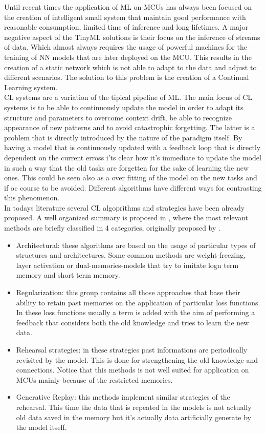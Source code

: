 \documentclass[12pt]{report}
\begin{document}
Until recent times the application of ML on MCUs has always been focused on the creation of intelligent small system that maintain good performance with reasonable consumption, limited time of inference and long lifetimes. A major negative aspect of the TinyML solutions is their focus on the inference of streams of data. Which almost always requires the usage of powerful machines for the training of NN models that are later deployed on the MCU. This results in the creation of a static network which is not able to adapt to the data and adjust to different scenarios. The solution to this problem is the creation of a Continual Learning system. \\
CL systems are a variation of the tipical pipeline of ML. The main focus of CL systems is to be able to continuously update the model in order to adapt its structure and parameters to overcome context drift, be able to recognize appearance of new patterns and to avoid catastrophic forgetting. The latter is a problem that is directly introduced by the nature of the paradigm itself. By having a model that is continuously updated with a feedback loop that is directly dependent on the current erross i'ts clear how it's immediate to update the model in such a way that the old tasks are forgetten for the sake of learning the new ones. This could be seen also as a over fitting of the model on the new tasks and if oc course to be avoided. Different algorithms have different ways for contrasting this phenomenon. \\
In todays literature several CL algoprithms and strategies have been already proposed. A well organized summary is proposed in \cite{lesort2020continual}, where the most relevant methods are briefly classified in 4 categories, originally proposed by \autocite{maltoni2019continuous}.
\begin{itemize}
\item Architectural: these algorithms are based on the usage of particular types of structures and architectures. Some common methods are weight-freezing, layer activation or dual-memories-models that try to imitate logn term memory and short term memory.
\item Regularization: this group contains all those approaches that base their ability to retain past memories on the application of particular loss functions. In these loss functions usually a term is added with the aim of performing a feedback that considers both the old knowledge and tries to learn the new data.
\item Rehearsal strategies: in these strategies past informations are periodically revisited by the model. This is done for strengthening the old knowledge and connections. Notice that this methods is not well suited for application on MCUs mainly because of the restricted memories. 
\item Generative Replay: this methods implement similar strategies of the rehearsal. This time the data that is repeated in the models is not actually old data saved in the memory but it's actually data artificially generate by the model itself. 
\end{itemize} 
\end{document}
